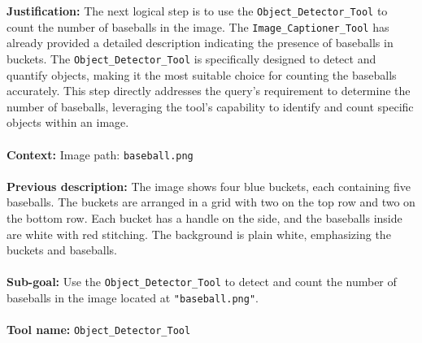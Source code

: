     
    \begin{plannerbox}
    
    \textbf{Justification:}
    The next logical step is to use the \texttt{Object\_Detector\_Tool} to count the number of baseballs in the image. The \texttt{Image\_Captioner\_Tool} has already provided a detailed description indicating the presence of baseballs in buckets. The \texttt{Object\_Detector\_Tool} is specifically designed to detect and quantify objects, making it the most suitable choice for counting the baseballs accurately. This step directly addresses the query's requirement to determine the number of baseballs, leveraging the tool's capability to identify and count specific objects within an image.
    \\\\
    \textbf{Context:}
    Image path: \texttt{baseball.png}
    \\\\
    \textbf{Previous description:}
    The image shows four blue buckets, each containing five baseballs. The buckets are arranged in a grid with two on the top row and two on the bottom row. Each bucket has a handle on the side, and the baseballs inside are white with red stitching. The background is plain white, emphasizing the buckets and baseballs.
    \\\\
    \textbf{Sub-goal:}
    Use the \texttt{Object\_Detector\_Tool} to detect and count the number of baseballs in the image located at \texttt{"baseball.png"}.
    \\\\
    \textbf{Tool name:} \texttt{Object\_Detector\_Tool}
    \end{plannerbox}
    
